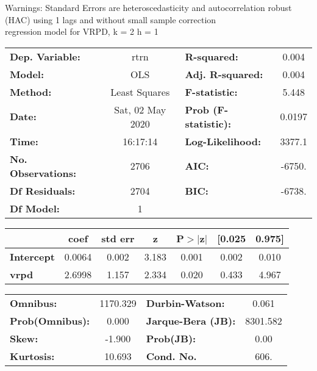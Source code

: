 Warnings: \newline
 [1] Standard Errors are heteroscedasticity and autocorrelation robust (HAC) using 1 lags and without small sample correction\\ 

regression model for VRPD, k = 2 h = 1\begin{center}
\begin{tabular}{lclc}
\toprule
\textbf{Dep. Variable:}    &       rtrn       & \textbf{  R-squared:         } &     0.004   \\
\textbf{Model:}            &       OLS        & \textbf{  Adj. R-squared:    } &     0.004   \\
\textbf{Method:}           &  Least Squares   & \textbf{  F-statistic:       } &     5.448   \\
\textbf{Date:}             & Sat, 02 May 2020 & \textbf{  Prob (F-statistic):} &   0.0197    \\
\textbf{Time:}             &     16:17:14     & \textbf{  Log-Likelihood:    } &    3377.1   \\
\textbf{No. Observations:} &        2706      & \textbf{  AIC:               } &    -6750.   \\
\textbf{Df Residuals:}     &        2704      & \textbf{  BIC:               } &    -6738.   \\
\textbf{Df Model:}         &           1      & \textbf{                     } &             \\
\bottomrule
\end{tabular}
\begin{tabular}{lcccccc}
                   & \textbf{coef} & \textbf{std err} & \textbf{z} & \textbf{P$> |$z$|$} & \textbf{[0.025} & \textbf{0.975]}  \\
\midrule
\textbf{Intercept} &       0.0064  &        0.002     &     3.183  &         0.001        &        0.002    &        0.010     \\
\textbf{vrpd}      &       2.6998  &        1.157     &     2.334  &         0.020        &        0.433    &        4.967     \\
\bottomrule
\end{tabular}
\begin{tabular}{lclc}
\textbf{Omnibus:}       & 1170.329 & \textbf{  Durbin-Watson:     } &    0.061  \\
\textbf{Prob(Omnibus):} &   0.000  & \textbf{  Jarque-Bera (JB):  } & 8301.582  \\
\textbf{Skew:}          &  -1.900  & \textbf{  Prob(JB):          } &     0.00  \\
\textbf{Kurtosis:}      &  10.693  & \textbf{  Cond. No.          } &     606.  \\
\bottomrule
\end{tabular}
\end{center}

